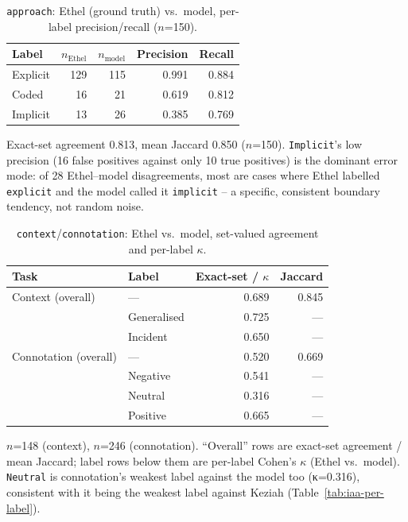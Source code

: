 \begin{table}[htbp]
\centering
\footnotesize
\setlength{\tabcolsep}{4pt}
\caption{\texttt{approach}: Ethel (ground truth) vs.\ model, per-label precision/recall ($n$=150).}
\label{tab:validation-approach}
\begin{tabular}{@{} l r r r r @{}}
\toprule
Label & $n_{\text{Ethel}}$ & $n_{\text{model}}$ & Precision & Recall \\
\midrule
Explicit & 129 & 115 & 0.991 & 0.884 \\
Coded & 16 & 21 & 0.619 & 0.812 \\
Implicit & 13 & 26 & 0.385 & 0.769 \\
\bottomrule
\end{tabular}

\vspace{2pt}
\raggedright\footnotesize
Exact-set agreement 0.813, mean Jaccard 0.850 ($n$=150). \texttt{Implicit}'s low precision (16 false positives against only 10 true positives) is the dominant error mode: of 28 Ethel--model disagreements, most are cases where Ethel labelled \texttt{explicit} and the model called it \texttt{implicit} -- a specific, consistent boundary tendency, not random noise.
\end{table}

\begin{table}[htbp]
\centering
\footnotesize
\setlength{\tabcolsep}{4pt}
\caption{\texttt{context}/\texttt{connotation}: Ethel vs.\ model, set-valued agreement and per-label $\kappa$.}
\label{tab:validation-context-connotation}
\begin{tabular}{@{} l l r r @{}}
\toprule
Task & Label & Exact-set / $\kappa$ & Jaccard \\
\midrule
Context (overall) & --- & 0.689 & 0.845 \\
& Generalised & 0.725 & --- \\
& Incident & 0.650 & --- \\
\midrule
Connotation (overall) & --- & 0.520 & 0.669 \\
& Negative & 0.541 & --- \\
& Neutral & 0.316 & --- \\
& Positive & 0.665 & --- \\
\bottomrule
\end{tabular}

\vspace{2pt}
\raggedright\footnotesize
$n$=148 (context), $n$=246 (connotation). ``Overall'' rows are exact-set agreement / mean Jaccard; label rows below them are per-label Cohen's $\kappa$ (Ethel vs.\ model). \texttt{Neutral} is connotation's weakest label against the model too (κ=0.316), consistent with it being the weakest label against Keziah (Table~\ref{tab:iaa-per-label}).
\end{table}

